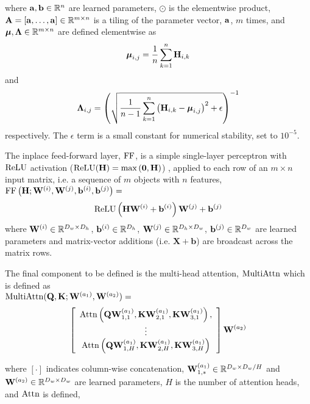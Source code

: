 where $\mathbf{a}, \mathbf{b} \in \mathbb{R}^n$ are learned parameters, $\odot$ is the elementwise product, $\mathbf{A} = \left[\mathbf{a},\ldots,\mathbf{a}\right] \in \mathbb{R}^{m\times n}$ is a tiling of the parameter vector, $\mathbf{a}$, $m$ times, and  $\boldsymbol{\mu}, \boldsymbol{\Lambda} \in \mathbb{R}^{m\times n}$ are
defined elementwise as
\[\boldsymbol{\mu}_{i,j} = \frac{1}{n} \sum_{k=1}^n \mathbf{H}_{i,k}\]
and 
\[\boldsymbol{\Lambda}_{i,j} = \left(
    \sqrt{ \frac{1}{n-1} \sum_{k=1}^n \left( 
\mathbf{H}_{i,k} - \boldsymbol{\mu}_{i,j} \right)^2  + \epsilon}\right)^{-1}\]
respectively. The $\epsilon$ term is a small constant for numerical stability,
set to $10^{-5}$.

The inplace feed-forward layer, $\operatorname{FF}$, is a simple single-layer perceptron
with $\operatorname{ReLU}$ activation 
($\operatorname{ReLU}(\mathbf{H}) = \max\left(\mathbf{0}, \mathbf{H}\right)$) \cite{nair2010}, applied to each row of an $m \times n$ input matrix, i.e. a sequence of $m$ objects
with $n$ features,\\


\noindent $\operatorname{FF}\left(\mathbf{H};\mathbf{W}^{(i)},\mathbf{W}^{(j)},\mathbf{b}^{(i)},\mathbf{b}^{(j)}\right) =$
\[  \operatorname{ReLU}\left(\mathbf{H}\mathbf{W}^{(i)} + \mathbf{b}^{(i)}\right)\mathbf{W}^{(j)} + \mathbf{b}^{(j)}     \]
where $\mathbf{W}^{(i)} \in \mathbb{R}^{{D_w} \times {D_h}}$, $\mathbf{b}^{(i)} \in \mathbb{R}^{{D_h}}$,
$\mathbf{W}^{(j)} \in \mathbb{R}^{{D_h} \times {D_w}}$, $\mathbf{b}^{(j)} \in \mathbb{R}^{{D_w}}$ are learned parameters and 
matrix-vector additions (i.e. $\mathbf{X} + \mathbf{b}$) are broadcast across
the matrix rows.


The final component to be defined is the multi-head attention, $\operatorname{MultiAttn}$ which is defined
as\\

\noindent  $\operatorname{MultiAttn}(\mathbf{Q}, \mathbf{K}; \mathbf{W}^{(a_1)}, \mathbf{W}^{(a_2)}) =$
\[ \left[ \begin{array}{c} 
            \operatorname{Attn}\left(\mathbf{Q}\mathbf{W}^{(a_1)}_{1,1}, \mathbf{K}\mathbf{W}^{(a_1)}_{2,1}, \mathbf{K} \mathbf{W}^{(a_1)}_{3,1} \right),\\
    \vdots \\
            \operatorname{Attn}\left(\mathbf{Q}\mathbf{W}^{(a_1)}_{1,H}, \mathbf{K}\mathbf{W}^{(a_1)}_{2,H}, \mathbf{K} \mathbf{W}^{(a_1)}_{3,H} \right)
\end{array} \right] \mathbf{W}^{(a_2)}
\]

where $\left[\cdot \right]$ indicates column-wise concatenation,  $\mathbf{W}^{(a_1)}_{1,*} \in \mathbb{R}^{{D_w}\times {D_w} / H}$
and $\mathbf{W}^{(a_2)} \in \mathbb{R}^{{D_w}\times {D_w}}$ are learned parameters,
$H$ is the number of attention heads, and  
$\operatorname{Attn}$ is defined,

